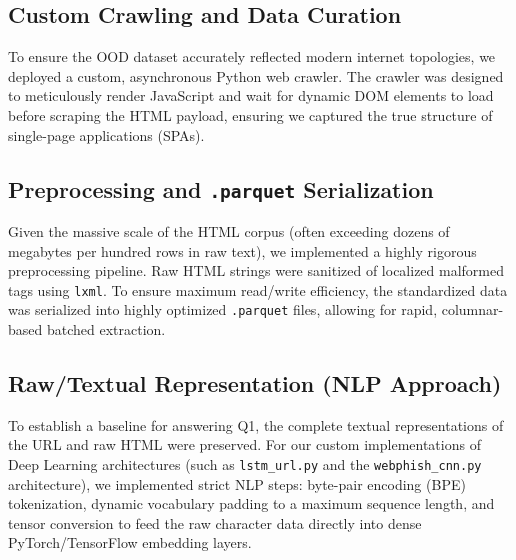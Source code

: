 \documentclass[conference]{IEEEtran}
\begin{document}
\subsection{Custom Crawling and Data Curation}
To ensure the OOD dataset accurately reflected modern internet topologies, we deployed a custom, asynchronous Python web crawler. The crawler was designed to meticulously render JavaScript and wait for dynamic DOM elements to load before scraping the HTML payload, ensuring we captured the true structure of single-page applications (SPAs). 

\subsection{Preprocessing and \texttt{.parquet} Serialization}
Given the massive scale of the HTML corpus (often exceeding dozens of megabytes per hundred rows in raw text), we implemented a highly rigorous preprocessing pipeline. Raw HTML strings were sanitized of localized malformed tags using \texttt{lxml}. To ensure maximum read/write efficiency, the standardized data was serialized into highly optimized \texttt{.parquet} files, allowing for rapid, columnar-based batched extraction.

\subsection{Raw/Textual Representation (NLP Approach)}
To establish a baseline for answering Q1, the complete textual representations of the URL and raw HTML were preserved. 
For our custom implementations of Deep Learning architectures (such as \texttt{lstm\_url.py} and the \texttt{webphish\_cnn.py} architecture), we implemented strict NLP steps: byte-pair encoding (BPE) tokenization, dynamic vocabulary padding to a maximum sequence length, and tensor conversion to feed the raw character data directly into dense PyTorch/TensorFlow embedding layers.
\end{document}
